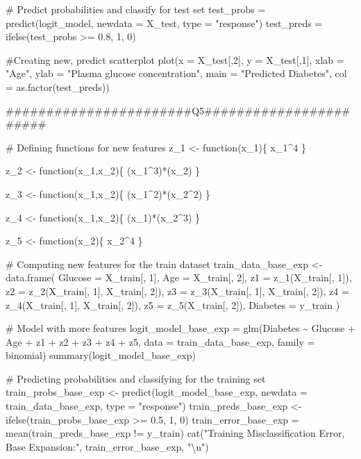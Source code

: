 \documentclass[
]{article}
\newenvironment{Shaded}{\begin{snugshade}}{\end{snugshade}}
\newcommand{\NormalTok}[1]{#1}
\begin{document}
\begin{Shaded}
\begin{Highlighting}[]
\NormalTok{\# Predict probabilities and classify for test set}
\NormalTok{test\_probs = predict(logit\_model, newdata = X\_test, type = "response")}
\NormalTok{test\_preds = ifelse(test\_probs \textgreater{}= 0.8, 1, 0)}

\NormalTok{\#Creating new, predict scatterplot}
\NormalTok{plot(x = X\_test[,2], }
\NormalTok{     y = X\_test[,1],}
\NormalTok{     xlab = "Age",}
\NormalTok{     ylab = "Plasma glucose concentration",}
\NormalTok{     main = "Predicted Diabetes",}
\NormalTok{     col = as.factor(test\_preds))}

\NormalTok{\#\#\#\#\#\#\#\#\#\#\#\#\#\#\#\#\#\#\#\#\#\#\#Q5\#\#\#\#\#\#\#\#\#\#\#\#\#\#\#\#\#\#\#\#\#\#\#}

\NormalTok{\# Defining functions for new features}
\NormalTok{z\_1 \textless{}{-} function(x\_1)\{}
\NormalTok{  x\_1\^{}4}
\NormalTok{\}}

\NormalTok{z\_2 \textless{}{-} function(x\_1,x\_2)\{}
\NormalTok{  (x\_1\^{}3)*(x\_2)}
\NormalTok{\}}

\NormalTok{z\_3 \textless{}{-} function(x\_1,x\_2)\{}
\NormalTok{  (x\_1\^{}2)*(x\_2\^{}2)}
\NormalTok{\}}

\NormalTok{z\_4 \textless{}{-} function(x\_1,x\_2)\{}
\NormalTok{  (x\_1)*(x\_2\^{}3)}
\NormalTok{\}}

\NormalTok{z\_5 \textless{}{-} function(x\_2)\{}
\NormalTok{  x\_2\^{}4}
\NormalTok{\}}

\NormalTok{\# Computing new features for the train dataset}
\NormalTok{train\_data\_base\_exp \textless{}{-} data.frame(}
\NormalTok{  Glucose = X\_train[, 1],}
\NormalTok{  Age = X\_train[, 2],}
\NormalTok{  z1 = z\_1(X\_train[, 1]),}
\NormalTok{  z2 = z\_2(X\_train[, 1], X\_train[, 2]),}
\NormalTok{  z3 = z\_3(X\_train[, 1], X\_train[, 2]),}
\NormalTok{  z4 = z\_4(X\_train[, 1], X\_train[, 2]),}
\NormalTok{  z5 = z\_5(X\_train[, 2]),}
\NormalTok{  Diabetes = y\_train}
\NormalTok{)}

\NormalTok{\# Model with more features}
\NormalTok{logit\_model\_base\_exp = glm(Diabetes \textasciitilde{} Glucose + Age + z1 + z2 + z3 + z4 + z5, data = train\_data\_base\_exp, family = binomial)}
\NormalTok{summary(logit\_model\_base\_exp)}

\NormalTok{\# Predicting probabilities and classifying for the training set}
\NormalTok{train\_probs\_base\_exp \textless{}{-} predict(logit\_model\_base\_exp, newdata = train\_data\_base\_exp, type = "response")}
\NormalTok{train\_preds\_base\_exp \textless{}{-} ifelse(train\_probs\_base\_exp \textgreater{}= 0.5, 1, 0)}
\NormalTok{train\_error\_base\_exp = mean(train\_preds\_base\_exp != y\_train)}
\NormalTok{cat("Training Misclassification Error, Base Expansion:", train\_error\_base\_exp, "\textbackslash{}n")}


\end{Highlighting}
\end{Shaded}
\end{document}
